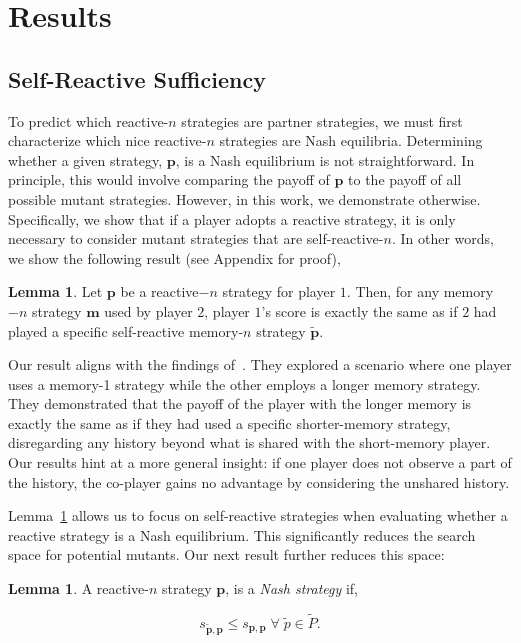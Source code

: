 \documentclass{article}
\theoremstyle{definition}
\newtheorem{lemma}[theorem]{Lemma}
\begin{document}
\section{Results}

\subsection{Self-Reactive Sufficiency}

To predict which reactive-$n$ strategies are partner strategies, we must first
characterize which nice reactive-$n$ strategies are Nash equilibria. Determining
whether a given strategy, $\mathbf{p}$, is a Nash equilibrium is not
straightforward. In principle, this would involve comparing the payoff of
$\mathbf{p}$ to the payoff of all possible mutant strategies. However, in this
work, we demonstrate otherwise. Specifically, we show that if a player adopts a
reactive strategy, it is only necessary to consider mutant strategies that are
self-reactive-$n$. In other words, we show the following result (see Appendix for
proof),

\begin{lemma}\label{lemma:self_reactive_sufficiency}
  Let $\mathbf{p}$ be a reactive$-n$ strategy for player $1$. Then, for any
  memory$-n$ strategy $\mathbf{m}$ used by player $2$, player $1$'s score is
  exactly the same as if $2$ had played a specific self-reactive memory-$n$
  strategy $\mathbf{\tilde{p}}$.
\end{lemma}

Our result aligns with the findings of~\citep{press:PNAS:2012}. They explored a
scenario where one player uses a memory-1 strategy while the other employs a
longer memory strategy. They demonstrated that the payoff of the player with the
longer memory is exactly the same as if they had used a specific shorter-memory
strategy, disregarding any history beyond what is shared with the short-memory
player. Our results hint at a more general insight: if one player does not
observe a part of the history, the co-player gains no advantage by considering
the unshared history.

Lemma~\ref{lemma:self_reactive_sufficiency} allows us to focus on self-reactive
strategies when evaluating whether a reactive strategy is a Nash equilibrium.
This significantly reduces the search space for potential mutants. Our next
result further reduces this space:

\begin{lemma}\label{lemma:nash_against_pure_self_reactive}
  A reactive-$n$ strategy $\mathbf{p}$, is a \textit{Nash strategy} if,

  \begin{equation}\label{Eq:NashReactive}
      s_{\mathbf{\tilde{p}}, \mathbf{p}} \leq s_{\mathbf{p},\mathbf{p}} \;\forall \; \tilde{p} \in \tilde{P}.
  \end{equation}
\end{lemma}
\end{document}
